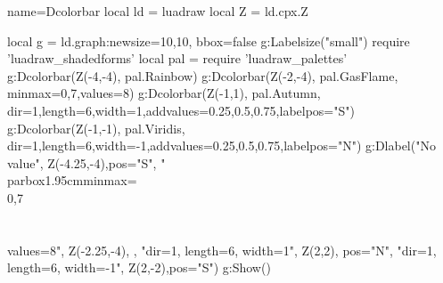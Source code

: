 \begin{luadraw}{name=Dcolorbar}
local ld = luadraw
local Z = ld.cpx.Z

local g = ld.graph:new{size={10,10}, bbox=false}
g:Labelsize("small")
require 'luadraw_shadedforms'
local pal = require 'luadraw_palettes'
g:Dcolorbar(Z(-4,-4), pal.Rainbow)
g:Dcolorbar(Z(-2,-4), pal.GasFlame, {minmax={0,7},values=8})
g:Dcolorbar(Z(-1,1), pal.Autumn, {dir=1,length=6,width=1,addvalues={0.25,0.5,0.75},labelpos="S"})
g:Dcolorbar(Z(-1,-1), pal.Viridis, {dir=1,length=6,width=-1,addvalues={0.25,0.5,0.75},labelpos="N"})
g:Dlabel("No value", Z(-4.25,-4),{pos="S"},
    "\\parbox{1.95cm}{minmax=\\{0,7\\}\\\\values=8}", Z(-2.25,-4), {},
    "dir=1, length=6, width=1", Z(2,2), {pos="N"},
    "dir=1, length=6, width=-1", Z(2,-2),{pos="S"})
g:Show()
\end{luadraw}
